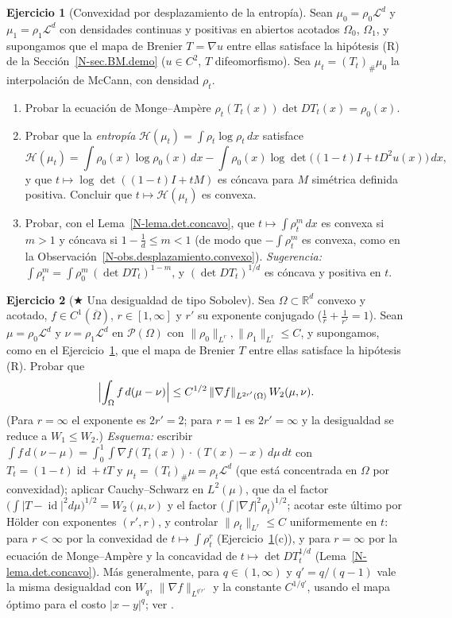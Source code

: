 \documentclass[11pt,a4paper]{amsart}
\newcounter{chapter}
\newcommand{\id}{\operatorname{id}}
\newcommand{\R}{{\mathbb R}}
\newcommand{\LL}{{\mathcal L}}
\theoremstyle{remark}
\theoremstyle{definition}
\newtheorem{ejercicio}{Ejercicio}[chapter]
\numberwithin{subsection}{section}
\numberwithin{equation}{section}
\begin{document}
\begin{ejercicio}[Convexidad por desplazamiento de la entropía]\label{ejer.BM.entropia}
Sean $\mu_0=\rho_0\LL^d$ y $\mu_1=\rho_1\LL^d$ con densidades continuas y
positivas en abiertos acotados $\Omega_0$, $\Omega_1$, y supongamos que el
mapa de Brenier $T=\nabla u$ entre ellas satisface la hipótesis (R) de la
Sección~\ref{N-sec.BM.demo} ($u\in C^2$, $T$ difeomorfismo). Sea
$\mu_t=(T_t)_\#\mu_0$ la interpolación de McCann, con densidad $\rho_t$.
\begin{enumerate}[label=(\alph*)]
\item Probar la ecuación de Monge--Ampère
$\rho_t(T_t(x))\det DT_t(x)=\rho_0(x)$.
\item Probar que la \emph{entropía}
$\mathcal H(\mu_t)=\int\rho_t\log\rho_t\,dx$ satisface
\[
\mathcal H(\mu_t)=\int\rho_0(x)\log\rho_0(x)\,dx-\int\rho_0(x)\log\det\bigl((1-t)I+tD^2u(x)\bigr)\,dx,
\]
y que $t\mapsto\log\det((1-t)I+tM)$ es cóncava para $M$ simétrica definida
positiva. Concluir que $t\mapsto\mathcal H(\mu_t)$ es convexa.
\item Probar, con el Lema~\ref{N-lema.det.concavo}, que $t\mapsto\int\rho_t^m\,dx$
es convexa si $m>1$ y cóncava si $1-\frac1d\le m<1$ (de modo que
$-\int\rho_t^m$ es convexa, como en la
Observación~\ref{N-obs.desplazamiento.convexo}). \emph{Sugerencia:}
$\int\rho_t^m=\int\rho_0^m\,(\det DT_t)^{1-m}$, y $(\det DT_t)^{1/d}$ es
cóncava y positiva en $t$.
\end{enumerate}
\end{ejercicio}

\begin{ejercicio}[$\bigstar$ Una desigualdad de tipo Sobolev]\label{ejer.BM.sobolev}
Sea $\Omega\subset\R^d$ convexo y acotado, $f\in C^1(\overline\Omega)$,
$r\in[1,\infty]$ y $r'$ su exponente conjugado ($\frac1r+\frac1{r'}=1$).
Sean $\mu=\rho_0\LL^d$ y $\nu=\rho_1\LL^d$ en $\mathcal P(\Omega)$ con
$\|\rho_0\|_{L^r},\|\rho_1\|_{L^r}\le C$, y supongamos, como en el
Ejercicio~\ref{ejer.BM.entropia}, que el mapa de Brenier $T$ entre ellas
satisface la hipótesis (R). Probar que
\[
\Bigl|\int_\Omega f\,d(\mu-\nu)\Bigr|\le C^{1/2}\,\|\nabla f\|_{L^{2r'}(\Omega)}\,W_2(\mu,\nu).
\]
(Para $r=\infty$ el exponente es $2r'=2$; para $r=1$ es $2r'=\infty$ y la
desigualdad se reduce a $W_1\le W_2$.)
\emph{Esquema:} escribir $\int f\,d(\nu-\mu)=\int_0^1\!\!\int\nabla f(T_t(x))\cdot(T(x)-x)\,d\mu\,dt$
con $T_t=(1-t)\id+tT$ y $\mu_t=(T_t)_\#\mu=\rho_t\LL^d$ (que está concentrada en
$\Omega$ por convexidad); aplicar Cauchy--Schwarz en $L^2(\mu)$, que da el
factor $\bigl(\int|T-\id|^2d\mu\bigr)^{1/2}=W_2(\mu,\nu)$ y el factor
$\bigl(\int|\nabla f|^2\rho_t\bigr)^{1/2}$; acotar este último por Hölder con
exponentes $(r',r)$, y controlar $\|\rho_t\|_{L^r}\le C$ uniformemente en $t$:
para $r<\infty$ por la convexidad de $t\mapsto\int\rho_t^r$
(Ejercicio~\ref{ejer.BM.entropia}(c)), y para $r=\infty$ por la ecuación de
Monge--Ampère y la concavidad de $t\mapsto\det DT_t^{1/d}$
(Lema~\ref{N-lema.det.concavo}). Más generalmente, para $q\in(1,\infty)$ y
$q'=q/(q-1)$ vale la misma desigualdad con $W_q$, $\|\nabla f\|_{L^{q'r'}}$
y la constante $C^{1/q'}$, usando el mapa óptimo para el costo $|x-y|^q$;
ver \cite[Sec.~5.5]{Santambrogio}.
\end{ejercicio}



\end{document}
